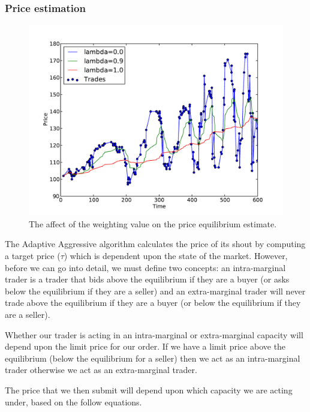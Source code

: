 \documentclass[preprint]{acm_proc_article-sp} %
\begin{document}
\subsubsection{Price estimation} \label{sec:AA_price_estimation}
\begin{figure}[H]
  \centering
  \includegraphics[width=\columnwidth]{graphs_and_stats/graph_equilibriums.pdf}
  \caption{The affect of the weighting value on the price equilibrium
  \label{fig:equilibrium}
  estimate.}
\end{figure}

The Adaptive Aggressive algorithm calculates the price of its shout by
computing a target price ($\tau$) which is dependent upon
the state of the market. However, before we can go into detail, we must define
two concepts: an intra-marginal trader is a trader that bids above the
equilibrium if they are a buyer (or asks below the equilibrium if they are a
seller) and an extra-marginal trader will never trade above the
equilibrium if they are a buyer (or below the equilibrium if they are a
seller).

Whether our trader is acting in an intra-marginal or extra-marginal capacity
will depend upon the limit price for our order. If we have a limit price above
the equilibrium (below the equilibrium for a seller) then we act as an
intra-marginal trader otherwise we act as an extra-marginal trader.

The price that we then submit will depend upon which capacity we are acting
under, based on the follow equations.
\end{document}
